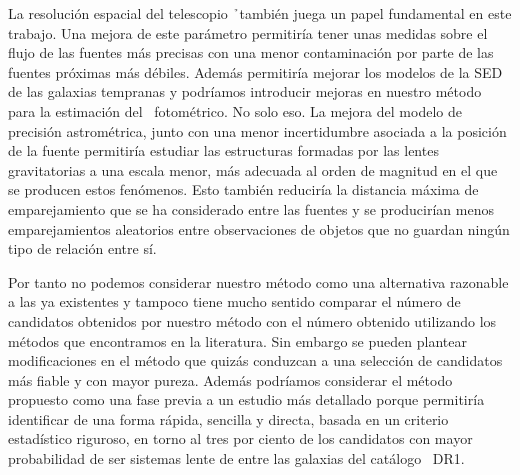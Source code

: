 La resolución espacial del telescopio \h\ también juega un papel fundamental en este trabajo. Una mejora de este parámetro permitiría tener unas medidas sobre el flujo de las fuentes más precisas con una menor contaminación por parte de las fuentes próximas más débiles. Además permitiría mejorar los modelos de la SED de las galaxias tempranas y podríamos introducir mejoras en nuestro método para la estimación del \rt\ fotométrico. No solo eso. La mejora del modelo de precisión astrométrica, junto con una menor incertidumbre asociada a la posición de la fuente permitiría estudiar las estructuras formadas por las lentes gravitatorias a una escala menor, más adecuada al orden de magnitud en el que se producen estos fenómenos. Esto también reduciría la distancia máxima de emparejamiento que se ha considerado entre las fuentes y se producirían menos emparejamientos aleatorios entre observaciones de objetos que no guardan ningún tipo de relación entre sí.

Por tanto no podemos considerar nuestro método como una alternativa razonable a las ya existentes y tampoco tiene mucho sentido comparar el número de candidatos obtenidos por nuestro método con el número obtenido utilizando los métodos que encontramos en la literatura. Sin embargo se pueden plantear modificaciones en el método que quizás conduzcan a una selección de candidatos más fiable y con mayor pureza. Además podríamos considerar el método propuesto como una fase previa a un estudio más detallado porque permitiría identificar de una forma rápida, sencilla y directa, basada en un criterio estadístico riguroso, en torno al tres por ciento de los candidatos con mayor probabilidad de ser sistemas lente de entre las galaxias del catálogo \hatlas\ DR1.